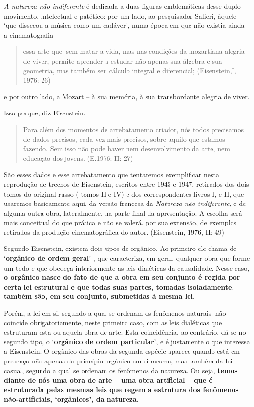 \emph{A natureza não-indiferente} é dedicada a duas figuras emblemáticas
desse duplo movimento, intelectual e patético: por um lado, ao
pesquisador Salieri, àquele `que dissecou a música como um cadáver',
numa época em que não existia ainda a cinematografia

\begin{quote}
essa arte que, sem matar a vida, mas nas condições da mozartiana alegria
de viver, permite aprender a estudar não apenas sua álgebra e sua
geometria, mas também seu cálculo integral e diferencial; (Eisenstein,I,
1976: 26)
\end{quote}

e por outro lado, a Mozart -- à sua memória, à sua transbordante alegria
de viver.

Isso porque, diz Eisenstein:

\begin{quote}
Para além dos momentos de arrebatamento criador, nós todos precisamos de
dados precisos, cada vez mais precisos, sobre aquilo que estamos
fazendo. Sem isso não pode haver nem desenvolvimento da arte, nem
educação dos jovens. (E.1976: II: 27)
\end{quote}

São esses dados e esse arrebatamento que tentaremos exemplificar nesta
reprodução de trechos de Eisenstein, escritos entre 1945 e 1947,
retirados dos dois tomos do original russo ( tomos II e IV) e dos
correspondentes livros I, e II, que usaremos basicamente aqui, da versão
francesa da \emph{Natureza não-indiferente}, e de alguma outra obra,
lateralmente, na parte final da apresentação. A escolha será mais
conceitual do que prática e não se valerá, por sua extensão, de exemplos
retirados da produção cinematográfica do autor. (Eisenstein, 1976, II:
49)

Segundo Eisenstein, existem dois tipos de orgânico. Ao primeiro ele
chama de `\textbf{orgânico de ordem geral}' , que caracteriza, em geral,
qualquer obra que forme um todo e que obedeça interiormente as leis
dialéticas da causalidade. Nesse caso, \textbf{o orgânico nasce do fato
de que a obra em seu conjunto é regida por certa lei estrutural e que
todas suas partes, tomadas isoladamente, também são, em seu conjunto,
submetidas à mesma lei}.

Porém, a lei em si, segundo a qual se ordenam os fenômenos naturais, não
coincide obrigatoriamente, neste primeiro caso, com as leis dialéticas
que estruturam esta ou aquela obra de arte. Esta coincidência, ao
contrário, dá-se no segundo tipo, o `\textbf{orgânico de ordem
particular}', e é justamente o que interessa a Eisenstein. O orgânico
das obras da segunda espécie aparece quando está em presença não apenas
do princípio orgânico em si mesmo, mas também da lei casual, segundo a
qual se ordenam os fenômenos da natureza. Ou seja, \textbf{temos diante
de nós uma obra de arte -- uma obra artificial -- que é estruturada
pelas mesmas leis que regem a estrutura dos fenômenos não-artificiais,
`orgânicos', da natureza.}

